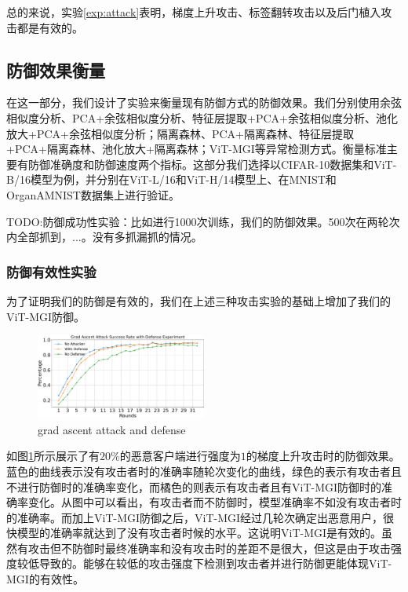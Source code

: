 \documentclass[conference]{IEEEtran}
\def\figGradAscentAttackDefense{0.5\textwidth}
\begin{document}
总的来说，实验\hyperref[exp:attack]{\ref{exp:attack}}表明，梯度上升攻击、标签翻转攻击以及后门植入攻击都是有效的。

\subsection{防御效果衡量}
\label{exp:defense}

在这一部分，我们设计了实验来衡量现有防御方式的防御效果。我们分别使用余弦相似度分析、PCA+余弦相似度分析、特征层提取+PCA+余弦相似度分析、池化放大+PCA+余弦相似度分析；隔离森林、PCA+隔离森林、特征层提取+PCA+隔离森林、池化放大+隔离森林；ViT-MGI等异常检测方式。衡量标准主要有防御准确度和防御速度两个指标。这部分我们选择以CIFAR-10数据集和ViT-B/16模型为例，并分别在ViT-L/16和ViT-H/14模型上、在MNIST和OrganAMNIST数据集上进行验证。


TODO:防御成功性实验：比如进行1000次训练，我们的防御效果。500次在两轮次内全部抓到，...。没有多抓漏抓的情况。
\subsubsection{\textbf{防御有效性实验}}
\label{exp:defenseEffectiveness}

为了证明我们的防御是有效的，我们在上述三种攻击实验的基础上增加了我们的ViT-MGI防御。

\begin{figure}[htbp]
    \centerline{\includegraphics[width=\figGradAscentAttackDefense]{pics/004-gradAttack-attackRate=1-withDefense.pdf}}
    \caption{grad ascent attack and defense}
    \label{fig:gradAscentDefense}
\end{figure}

如图\hyperref[fig:gradAscentDefense]{\ref{fig:gradAscentDefense}}所示展示了有$20\%$的恶意客户端进行强度为$1$的梯度上升攻击时的防御效果。蓝色的曲线表示没有攻击者时的准确率随轮次变化的曲线，绿色的表示有攻击者且不进行防御时的准确率变化，而橘色的则表示有攻击者且有ViT-MGI防御时的准确率变化。从图中可以看出，有攻击者而不防御时，模型准确率不如没有攻击者时的准确率。而加上ViT-MGI防御之后，ViT-MGI经过几轮次确定出恶意用户，很快模型的准确率就达到了没有攻击者时候的水平。这说明ViT-MGI是有效的。虽然有攻击但不防御时最终准确率和没有攻击时的差距不是很大，但这是由于攻击强度较低导致的。能够在较低的攻击强度下检测到攻击者并进行防御更能体现ViT-MGI的有效性。
\end{document}
